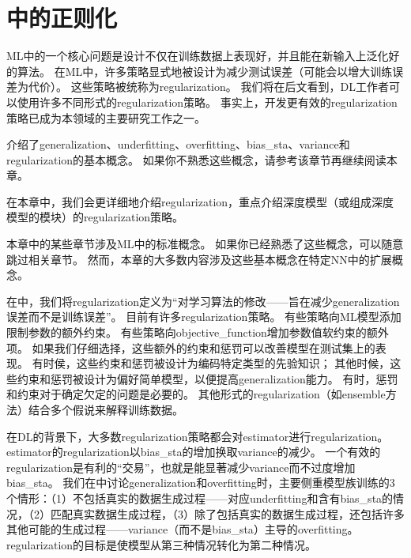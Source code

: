 \chapter{中的正则化}
\label{chap:regularization_for_deep_learning}
\gls{ML}中的一个核心问题是设计不仅在训练数据上表现好，并且能在新输入上泛化好的算法。
在\gls{ML}中，许多策略显式地被设计为减少测试误差（可能会以增大训练误差为代价）。
这些策略被统称为\gls{regularization}。
我们将在后文看到，\gls{DL}工作者可以使用许多不同形式的\gls{regularization}策略。
事实上，开发更有效的\gls{regularization}策略已成为本领域的主要研究工作之一。

介绍了\gls{generalization}、\gls{underfitting}、\gls{overfitting}、\gls{bias_sta}、\gls{variance}和\gls{regularization}的基本概念。
如果你不熟悉这些概念，请参考该章节再继续阅读本章。

在本章中，我们会更详细地介绍\gls{regularization}，重点介绍深度模型（或组成深度模型的模块）的\gls{regularization}策略。

本章中的某些章节涉及\gls{ML}中的标准概念。
如果你已经熟悉了这些概念，可以随意跳过相关章节。
然而，本章的大多数内容涉及这些基本概念在特定\gls{NN}中的扩展概念。

在中，我们将\gls{regularization}定义为``对学习算法的修改——旨在减少\gls{generalization}误差而不是训练误差''。
目前有许多\gls{regularization}策略。
有些策略向\gls{ML}模型添加限制参数的额外约束。
有些策略向\gls{objective_function}增加参数值软约束的额外项。
如果我们仔细选择，这些额外的约束和惩罚可以改善模型在测试集上的表现。
有时侯，这些约束和惩罚被设计为编码特定类型的先验知识；
其他时候，这些约束和惩罚被设计为偏好简单模型，以便提高\gls{generalization}能力。
有时，惩罚和约束对于确定欠定的问题是必要的。
其他形式的\gls{regularization}（如\gls{ensemble}方法）结合多个假说来解释训练数据。


在\gls{DL}的背景下，大多数\gls{regularization}策略都会对\gls{estimator}进行\gls{regularization}。
\gls{estimator}的\gls{regularization}以\gls{bias_sta}的增加换取\gls{variance}的减少。
一个有效的\gls{regularization}是有利的``交易''，也就是能显著减少\gls{variance}而不过度增加\gls{bias_sta}。
我们在中讨论\gls{generalization}和\gls{overfitting}时，主要侧重模型族训练的3个情形：（1）不包括真实的数据生成过程——对应\gls{underfitting}和含有\gls{bias_sta}的情况，（2）匹配真实数据生成过程，（3）除了包括真实的数据生成过程，还包括许多其他可能的生成过程——\gls{variance}（而不是\gls{bias_sta}）主导的\gls{overfitting}。
\gls{regularization}的目标是使模型从第三种情况转化为第二种情况。

